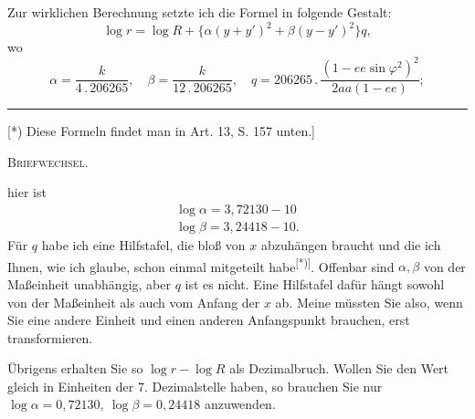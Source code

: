 Zur wirklichen Berechnung setzte ich die Formel in folgende Gestalt:
\[
\log r=\log R+\{\alpha(y+y')^2+\beta(y-y')^2\}q,
\]
\noindent wo
\[
\alpha=\frac{k}{4\,.\,206265},\quad\beta=\frac{k}{12\,.\,206265},\quad q=206265\,.\,\frac{(1-ee\sin\varphi^2)^2}{2aa(1-ee)};
\]
\par\noindent\rule{4cm}{.4pt}\par
{\footnotesize\noindent\hspace*{\parindent}[*) Diese Formeln findet man in Art. 13, S. 157 unten.]\par}

\par\clearpage
{}\hfill\textsc{Briefwechsel.}\hfill\mbox{}\par\medskip
\noindent hier ist
\[
\begin{array}{l}
\log\alpha=3{,}72130-10\\
\log\beta=3{,}24418-10.
\end{array}
\]
Für \(q\) habe ich eine Hilfstafel, die bloß von \(x\) abzuhängen braucht und die ich Ihnen, wie ich glaube, schon einmal mitgeteilt habe\textsuperscript{[*)]}. Offenbar sind \(\alpha,\beta\) von der Maßeinheit unabhängig, aber \(q\) ist es nicht. Eine Hilfstafel dafür hängt sowohl von der Maßeinheit als auch vom Anfang der \(x\) ab. Meine müssten Sie also, wenn Sie eine andere Einheit und einen anderen Anfangspunkt brauchen, erst transformieren.

Übrigens erhalten Sie so \(\log r-\log R\) als Dezimalbruch. Wollen Sie den Wert gleich in Einheiten der 7. Dezimalstelle haben, so brauchen Sie nur \(\log\alpha=0{,}72130,\ \log\beta=0{,}24418\) anzuwenden.

